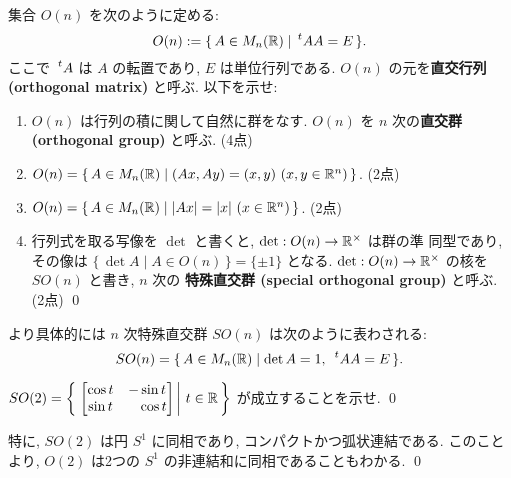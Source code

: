 \documentclass[12pt,twoside]{jarticle}
\begin{document}
\begin{question}
 集合 $O(n)$ を次のように定める:
 \begin{equation*}
  O(n) := \{\, A\in M_n(\R) \mid \tp{A}A=E \,\}.
 \end{equation*}
 ここで $\tp{A}$ は $A$ の転置であり, $E$ は単位行列である.
 $O(n)$ の元を{\bf 直交行列 (orthogonal matrix)} と呼ぶ.
 以下を示せ:
 \begin{enumerate}
  \item $O(n)$ は行列の積に関して自然に群をなす.
   $O(n)$ を $n$ 次の{\bf 直交群 (orthogonal group)} と呼ぶ.
   (4点)
  \item $O(n)=\{\, A\in M_n({\mathbb R}) \mid (Ax,Ay)=(x,y) \ (x,y\in{\mathbb R}^n) \,\}$.
   (2点)
  \item $O(n)=\{\, A\in M_n(\R) \mid |Ax|=|x| \ (x\in\R^n) \,\}$.
   (2点)
  \item 行列式を取る写像を $\det$ と書くと, $\det:O(n)\to{\mathbb R}^\times$ は群の準
   同型であり, その像は $\{\,\det A\mid A\in O(n)\,\} = \{\pm1\}$ となる.
   $\det:O(n)\to{\mathbb R}^\times$ の核を $SO(n)$ と書き, $n$ 次の
   {\bf 特殊直交群 (special orthogonal group)} と呼ぶ.
   (2点)
   \qed
 \end{enumerate}
\end{question}

より具体的には $n$ 次特殊直交群 $SO(n)$ は次のように表わされる:
\begin{equation*}
 SO(n) = \{\, A\in M_n(\R) \mid \det A = 1,\ \tp{A}A = E \,\}.
\end{equation*}


\begin{question}
  \( \displaystyle
    SO(2)
    =
    \left\{\,
    \left.
      \begin{bmatrix}
        \cos t &          - \sin t \\
        \sin t & \phantom{-}\cos t
      \end{bmatrix}
    \,\right|\,
      t \in {\mathbb R}
    \,\right\}
  \) %
  が成立することを示せ. 
  \qed
\end{question}

\begin{rem}
 特に, $SO(2)$ は円 $S^1$ に同相であり, 
 コンパクトかつ弧状連結である. 
 このことより, $O(2)$ は2つの $S^1$ の非連結和に同相であることもわかる. 
 \qed
\end{rem}

\end{document}
